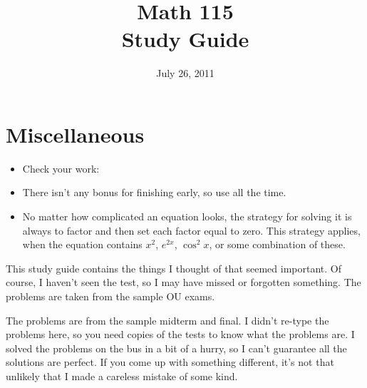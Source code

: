 \documentclass[fleqn,addpoints]{exam}
\title{Math 115 \\ Study Guide}
\date{July 26, 2011}
\begin{document}
\maketitle



\section{Miscellaneous}

\begin{itemize}
\item Check your work:
\item There isn't any bonus for finishing early, so use all the time.
\item No matter how complicated an equation looks, the strategy for solving it is always to factor and then set each
  factor equal to zero.  This strategy applies, when the equation contains $x^2$, $e^{2x}$, $\cos^2 x$, or some
  combination of these.
\end{itemize}

This study guide contains the things I thought of that seemed important.  Of course, I haven't seen the test, so I may have
missed or forgotten something.  The problems are taken from the sample OU exams.

The problems are from the sample midterm and final.  I didn't re-type the problems here, so you need copies of the tests
to know what the problems are.  I solved the problems on the bus in a bit of a hurry, so I can't guarantee all the
solutions are perfect.  If you come up with something different, it's not that unlikely that I made a careless mistake
of some kind.
\end{document}
